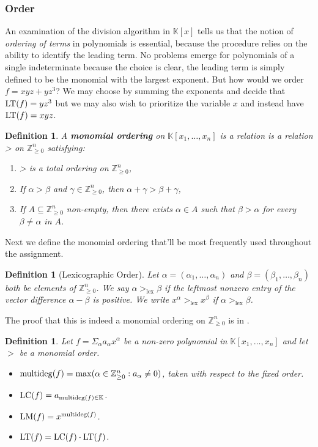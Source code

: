 \documentclass[a4paper,12pt]{article}
\newtheorem{definition}[theorem]{Definition}
\newcommand{\KK}{\mathbb{K}}
\newcommand{\ZZ}{\mathbb{Z}}
\newcommand{\LM }{{\rm LM}}
\newcommand{\LT }{{\rm LT}}
\newcommand{\LC }{{\rm LC}}
\newcommand{\mdeg}{{\rm multideg}}
\begin{document}
\subsubsection{Order}
An examination of the division algorithm in $\KK[x]$ tells us that the notion of \textit{ordering of terms} in polynomials is essential, because the procedure relies on the ability to identify the leading term. No problems emerge for polynomials of a single indeterminate because the choice is clear, the leading term is simply defined to be the monomial with the largest exponent. But how would we order $f = xyz + yz^3$? We may choose by summing the exponents and decide that $\LT(f) = yz^3$ but we may also wish to prioritize the variable $x$ and instead have $\LT(f) = xyz$.
\begin{definition}
	A \textbf{monomial ordering} on $\KK[x_1, \ldots, x_n]$ is a relation is a relation > on $\ZZ_{\geq 0}^n$ satisfying:
	\begin{enumerate}
		\item > is a total ordering on $\ZZ_{\geq 0}^n$,
		\item If $\alpha > \beta$ and $\gamma \in \ZZ_{\geq 0}^n$, then $\alpha + \gamma >  \beta + \gamma$,
		\item If $A \subseteq \ZZ_{\geq 0}^n$ non-empty, then there exists $\alpha \in A$ such that $\beta > \alpha$ for every $\beta \neq \alpha$ in $A$.
	\end{enumerate}
\end{definition}

Next we define the monomial ordering that'll be most frequently used throughout the assignment.

\begin{definition}[Lexicographic Order]
	Let $\alpha = (\alpha_1, \ldots, \alpha_n)$ and $\beta = (\beta_1, \ldots, \beta_n)$ both be elements of $\ZZ_{\geq 0}^n$. We say $\alpha >_\text{lex} \beta$ if the leftmost nonzero entry of the vector difference $\alpha - \beta$ is positive. We write $x^\alpha >_\text{lex} x^\beta$ if $\alpha >_\text{lex} \beta$.
\end{definition}

The proof that this is indeed a monomial ordering on $\ZZ_{\geq 0}^n$ is in \cite{CoxLittleOshea}.

\begin{definition}
	Let $f = \Sigma_\alpha a_\alpha x^\alpha$ be a non-zero polynomial in $\KK[x_1, \ldots, x_n]$ and let $>$ be a monomial order.
	\begin{itemize}
		\item $\mdeg(f) = \max(\alpha \in \ZZ_{\geq 0}^n : a_\alpha \neq 0)$, taken with respect to the fixed order.
		\item  $\LC(f) = a_{\mdeg(f) \in \KK}$.
		\item $\LM(f) = x^{\mdeg(f)}$.
		\item  $\LT(f) = \LC(f)\cdot\LT(f)$.
	\end{itemize}
\end{definition}
\end{document}
